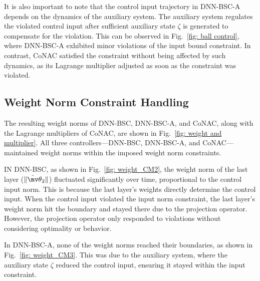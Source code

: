 \documentclass[lettersize,journal]{IEEEtran}
\newcommand*{\wth}{\mv\theta}
\begin{document}
It is also important to note that the control input trajectory in DNN-BSC-A depends on the dynamics of the auxiliary system. The auxiliary system regulates the violated control input after sufficient auxiliary state $\zeta$ is generated to compensate for the violation. This can be observed in Fig.~\ref{fig: ball control}, where DNN-BSC-A exhibited minor violations of the input bound constraint. In contrast, CoNAC satisfied the constraint without being affected by such dynamics, as its Lagrange multiplier adjusted as soon as the constraint was violated.


\subsection{Weight Norm Constraint Handling}

The resulting weight norms of DNN-BSC, DNN-BSC-A, and CoNAC, along with the Lagrange multipliers of CoNAC, are shown in Fig.~\ref{fig: weight and multiplier}. All three controllers—DNN-BSC, DNN-BSC-A, and CoNAC—maintained weight norms within the imposed weight norm constraints.

IN DNN-BSC, as shown in Fig.~\ref{fig: weight_CM2}, the weight norm of the last layer (\ie $\Vert {{{\hat \wth }_2}} \Vert$) fluctuated significantly over time, proportional to the control input norm. This is because the last layer’s weights directly determine the control input. When the control input violated the input norm constraint, the last layer’s weight norm hit the boundary and stayed there due to the projection operator. However, the projection operator only responded to violations without considering optimality or behavior.

In DNN-BSC-A, none of the weight norms reached their boundaries, as shown in Fig.~\ref{fig: weight_CM3}. This was due to the auxiliary system, where the auxiliary state $\zeta$ reduced the control input, ensuring it stayed within the input constraint.
\end{document}

